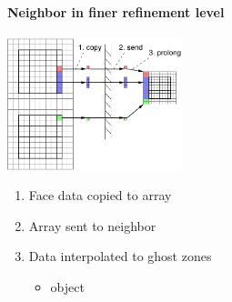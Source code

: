 \begin{frame}[fragile]
\secframetitle{\ssRefresh}
\framesubtitle{Neighbor in finer refinement level}
\begin{minipage}{2.0in}
\begin{center}
   \includegraphics[width=2.0in]{refresh-fine.pdf} \ \\
\end{center}
\end{minipage}
\begin{minipage}{2.1in}
\begin{enumerate}
\item Face data copied to array
\item Array sent to neighbor
\item Data interpolated to ghost zones
\begin{itemize}
\item {} object
\end{itemize}
\end{enumerate}
\end{minipage}
\end{frame}


